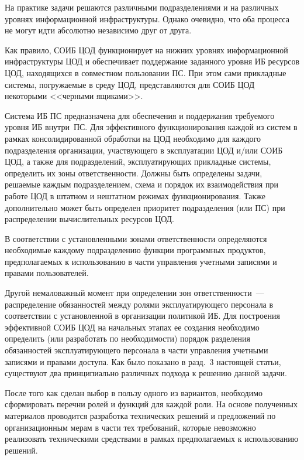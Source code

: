 \begin{multicols}{2}
       На практике задачи решаются различными подразделениями и на различных 
уровнях информационной инфраструктуры. Однако очевидно, что оба процесса не могут 
идти абсолютно независимо друг от друга.
       
       Как правило, СОИБ ЦОД функционирует на нижних уровнях информационной 
инфраструктуры ЦОД и обеспечивает поддержание заданного уровня ИБ ресурсов ЦОД, 
находящихся в совместном пользовании ПС. При этом сами прикладные сис\-те\-мы, 
погружаемые в среду ЦОД, представляются для СОИБ ЦОД некоторыми <<черными 
ящиками>>.
       
       Система ИБ ПС предназначена для обеспечения и поддержания требуемого 
уровня ИБ внут\-ри~ПС. 
Для эффективного функционирования каждой из сис\-тем в рамках 
консолидированной обработки на ЦОД необходимо для каждого подразделения 
организации, участвующего в эксплуатации ЦОД и/или СОИБ ЦОД, а также для 
подразделений, эксплуатирующих прикладные сис\-те\-мы, определить их зоны 
ответственности. Должны быть определены задачи, решаемые каждым подразделением, 
схема и порядок их взаимодействия при работе ЦОД в штатном и нештатном режимах
функционирования. Также дополнительно может быть определен приоритет 
подразделения (или ПС) при распределении вычислительных ресурсов ЦОД.
       {%

}

       В соответствии с уста\-нов\-лен\-ны\-ми зонами ответственности определяются 
необходимые каждому подразделению функции программных продуктов, 
предполагаемых к использованию в части управ\-ле\-ния учетными записями и правами 
пользова\-телей.
{%

}
       
       Другой немаловажный момент при определении зон ответственности~--- 
распределение обязанностей между ролями эксплуатирующего персонала в соответствии 
с уста\-нов\-лен\-ной в организации политикой ИБ. Для построения эффективной СОИБ ЦОД 
на начальных этапах ее создания необходимо определить (или разработать по 
не\-об\-хо\-ди\-мости) порядок разделения обязанностей экс\-плу\-а\-ти\-ру\-юще\-го персонала в части 
управления учетными записями и правами доступа. Как было показано в разд.~3 
настоящей статьи, существуют два принципиально различных подхода к решению данной 
за\-дачи.
{

}       
       После того как сделан выбор в пользу одного из вариантов, необходимо 
сформировать перечни ролей и функций для каждой роли. На основе полученных 
материалов проводится разработка технических решений и предложений по 
организационным мерам в части тех требований, которые невозможно реализовать 
техническими средствами в рамках предполагаемых к использованию решений.


\end{multicols}
